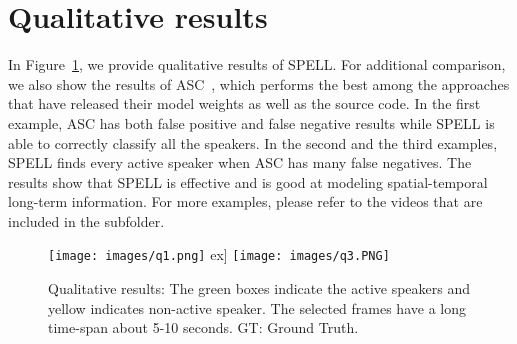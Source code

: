 \documentclass[runningheads]{llncs}
\begin{document}
\section{Qualitative results}
In Figure~\ref{fig:quality}, we provide qualitative results of SPELL. For additional comparison, we also show the results of ASC~\cite{alcazarActiveSpeakersContext2020}, which performs the best among the approaches that have released their model weights as well as the source code. In the first example, ASC has both false positive and false negative results while SPELL is able to correctly classify all the speakers. In the second and the third examples, SPELL finds every active speaker when ASC has many false negatives. The results show that SPELL is effective and is good at modeling spatial-temporal long-term information. For more examples, please refer to the videos that are included in the subfolder.

\begin{figure}[htbp]
  \small
    \texttt{[image: images/q1.png]} \2ex]
    \texttt{[image: images/q3.PNG]}
    \caption{Qualitative results: The green boxes indicate the active speakers and yellow indicates non-active speaker. The selected frames have a long time-span about 5-10 seconds. GT: Ground Truth.}
  \label{fig:quality}
\end{figure} 
\end{document}
